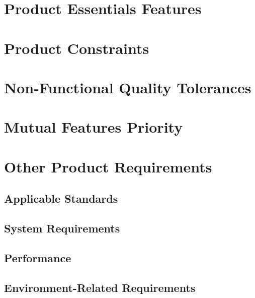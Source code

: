 \documentclass[12pt,a4paper,oneside, titlepage]{article}
\begin{document}
    \newpage
	\section{Product Essentials Features}

    \newpage
	\section{Product Constraints}
	
    \newpage
	\section{Non-Functional Quality Tolerances}
	
	\newpage
	\section{Mutual Features Priority}
	
    \newpage
	\section{Other Product Requirements}
	\subsection{Applicable Standards}
	\subsection{System Requirements}
	\subsection{Performance}
	\subsection{Environment-Related Requirements}

    \newpage
\end{document}
